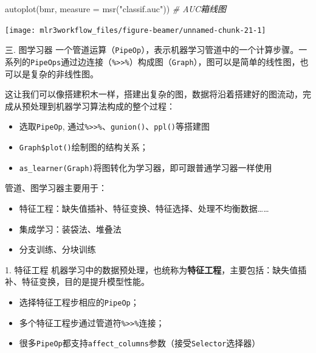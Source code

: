 \documentclass[
  11pt,
  ignorenonframetext,
  dvipsnames,UTF8]{beamer}
\newenvironment{Shaded}{\begin{snugshade}}{\end{snugshade}}
\newcommand{\AttributeTok}[1]{\textcolor[rgb]{0.77,0.63,0.00}{#1}}
\newcommand{\CommentTok}[1]{\textcolor[rgb]{0.56,0.35,0.01}{\textit{#1}}}
\newcommand{\FunctionTok}[1]{\textcolor[rgb]{0.00,0.00,0.00}{#1}}
\newcommand{\NormalTok}[1]{#1}
\newcommand{\StringTok}[1]{\textcolor[rgb]{0.31,0.60,0.02}{#1}}
\providecommand{\tightlist}{%
  \setlength{\itemsep}{0pt}\setlength{\parskip}{0pt}}
\begin{document}
\begin{frame}[fragile]{}
\protect\hypertarget{section-13}{}
\begin{Shaded}
\begin{Highlighting}[]
\FunctionTok{autoplot}\NormalTok{(bmr, }\AttributeTok{measure =} \FunctionTok{msr}\NormalTok{(}\StringTok{"classif.auc"}\NormalTok{))  }\CommentTok{\# AUC箱线图}
\end{Highlighting}
\end{Shaded}

\begin{center}\texttt{[image: mlr3workflow\_files/figure-beamer/unnamed-chunk-21-1]} \end{center}
\end{frame}

\begin{frame}[fragile]{三. 图学习器}
\protect\hypertarget{ux4e09.-ux56feux5b66ux4e60ux5668}{}
一个管道运算（\texttt{PipeOp}），表示机器学习管道中的一个计算步骤。一系列的\texttt{PipeOps}通过边连接（\texttt{\%\textgreater{}\textgreater{}\%}）构成图（\texttt{Graph}），图可以是简单的线性图，也可以是复杂的非线性图。

这让我们可以像搭建积木一样，搭建出复杂的图，数据将沿着搭建好的图流动，完成从预处理到机器学习算法构成的整个过程：

\begin{itemize}
\tightlist
\item
  选取\texttt{PipeOp},
  通过\texttt{\%\textgreater{}\textgreater{}\%}、\texttt{gunion()}、\texttt{ppl()}等搭建图
\item
  \texttt{Graph\$plot()}绘制图的结构关系；
\item
  \texttt{as\_learner(Graph)}将图转化为学习器，即可跟普通学习器一样使用
\end{itemize}

管道、图学习器主要用于：

\begin{itemize}
\tightlist
\item
  特征工程：缺失值插补、特征变换、特征选择、处理不均衡数据\ldots\ldots{}
\item
  集成学习：装袋法、堆叠法
\item
  分支训练、分块训练
\end{itemize}
\end{frame}

\begin{frame}[fragile]{1. 特征工程}
\protect\hypertarget{ux7279ux5f81ux5de5ux7a0b}{}
机器学习中的数据预处理，也统称为\textbf{特征工程}，主要包括：缺失值插补、特征变换，目的是提升模型性能。

\begin{itemize}
\tightlist
\item
  选择特征工程步相应的\texttt{PipeOp}；
\item
  多个特征工程步通过管道符\texttt{\%\textgreater{}\textgreater{}\%}连接；
\item
  很多\texttt{PipeOp}都支持\texttt{affect\_columns}参数（接受\texttt{Selector}选择器）
\end{itemize}
\end{frame}
\end{document}

